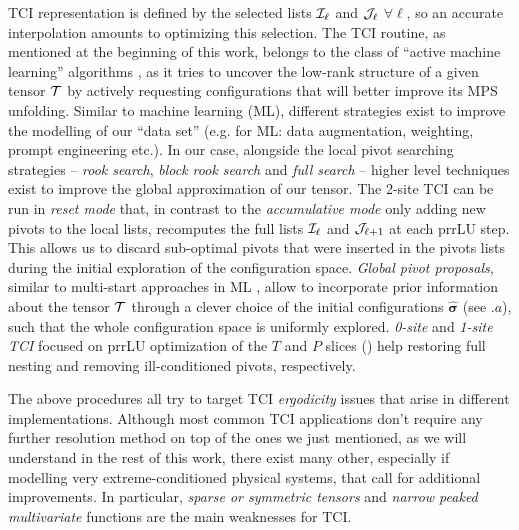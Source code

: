 TCI representation is defined by the selected lists $\mathcal{I}_\ell$ and $\mathcal{J}_\ell$ $\forall \ell$, so an accurate interpolation amounts to optimizing this selection. The TCI routine, as mentioned at the beginning of this work, belongs to the class of ``active machine learning'' algorithms \cite{Settles2012}, as it tries to uncover the low-rank structure of a given tensor $\mathcal{T}$ by actively requesting configurations that will better improve its MPS unfolding. Similar to machine learning (ML), different strategies exist to improve the modelling of our ``data set'' (e.g. for ML: data augmentation, weighting, prompt engineering etc.).
In our case, alongside the local pivot searching strategies -- \textit{rook search}, \textit{block rook search} and \textit{full search} -- higher level techniques exist to improve the global approximation of our tensor. The 2-site TCI can be run in \textit{reset mode} that, in contrast to the \textit{accumulative mode} only adding new pivots to the local lists, recomputes the full lists $\mathcal{I}_\ell$ and $\mathcal{J}_{\ell+1}$ at each prrLU step. This allows us to discard sub-optimal pivots that were inserted in the pivots lists during the initial exploration of the configuration space. \textit{Global pivot proposals}, similar to multi-start approaches in ML \cite{Loshchilov2017}, allow to incorporate prior information about the tensor $\mathcal{T}$ through a clever choice of the initial configurations $\boldsymbol{\hat  \sigma}$ (see $.a$), such that the whole configuration space is uniformly explored. \textit{0-site} and \textit{1-site TCI} focused on prrLU optimization of the $T$ and $P$ slices () help restoring full nesting and removing ill-conditioned pivots, respectively.

The above procedures all try to target TCI \textit{ergodicity} issues that arise in different implementations. Although most common TCI applications don't require any further resolution method on top of the ones we just mentioned, as we will understand in the rest of this work, there exist many other, especially if modelling very extreme-conditioned physical systems, that call for additional improvements. In particular, \textit{sparse or symmetric tensors} and \textit{narrow peaked multivariate} functions are the main weaknesses for TCI.


